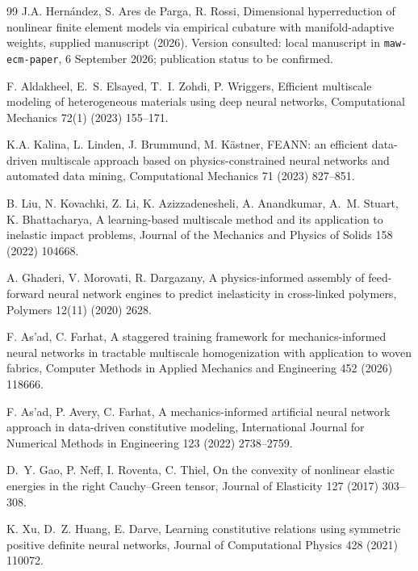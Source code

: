 \begin{thebibliography}{99}
J.A. Hern\'andez, S. Ares de Parga, R. Rossi, Dimensional hyperreduction of nonlinear finite element models via empirical cubature with manifold-adaptive weights, supplied manuscript (2026). Version consulted: local manuscript in \texttt{maw-ecm-paper}, 6 September 2026; publication status to be confirmed.

F. Aldakheel, E.~S. Elsayed, T.~I. Zohdi, P. Wriggers, Efficient
multiscale modeling of heterogeneous materials using deep neural
networks, Computational Mechanics 72(1) (2023) 155--171.

K.A. Kalina, L. Linden, J. Brummund, M. K\"astner, FEANN: an efficient data-driven multiscale approach based on physics-constrained neural networks and automated data mining, Computational Mechanics 71 (2023) 827--851. 

B. Liu, N. Kovachki, Z. Li, K. Azizzadenesheli, A. Anandkumar, A.~M.
Stuart, K. Bhattacharya, A learning-based multiscale method and its
application to inelastic impact problems, Journal of the
Mechanics and Physics of Solids 158 (2022) 104668.

A. Ghaderi, V. Morovati, R. Dargazany, A physics-informed assembly of
feed-forward neural network engines to predict inelasticity in
cross-linked polymers, Polymers 12(11) (2020) 2628.

F. As'ad, C. Farhat, A staggered training framework for
mechanics-informed neural networks in tractable multiscale
homogenization with application to woven fabrics, Computer
Methods in Applied Mechanics and Engineering 452 (2026) 118666.

F. As'ad, P. Avery, C. Farhat, A mechanics-informed artificial neural network approach in data-driven constitutive modeling, International Journal for Numerical Methods in Engineering 123 (2022) 2738--2759. 

D.~Y. Gao, P. Neff, I. Roventa, C. Thiel, On the convexity of
nonlinear elastic energies in the right Cauchy--Green tensor,
Journal of Elasticity 127 (2017) 303--308.

K. Xu, D.~Z. Huang, E. Darve, Learning constitutive relations using
symmetric positive definite neural networks,
Journal of Computational Physics 428 (2021) 110072.


\end{thebibliography}
